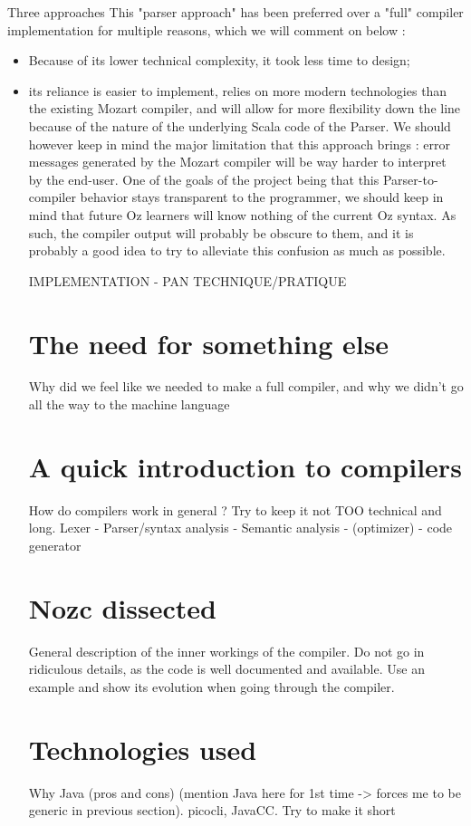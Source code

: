 Three approaches
This "parser approach" has been preferred over a "full" compiler implementation for multiple reasons, which we will comment on below :
\begin{itemize}
    \item Because of its lower technical complexity, it took less time to design;
    \item its reliance
is easier to implement, relies on more modern technologies than the existing Mozart compiler, and will allow for more flexibility down the line because of the nature of the underlying Scala code of the Parser.
We should however keep in mind the major limitation that this approach brings : error messages generated by the Mozart compiler will be way harder to interpret by the end-user.
One of the goals of the project being that this Parser-to-compiler behavior stays transparent to the programmer, we should keep in mind that future Oz learners will know nothing of the current Oz syntax.
As such, the compiler output will probably be obscure to them, and it is probably a good idea to try to alleviate this confusion as much as possible.\newline

IMPLEMENTATION - PAN TECHNIQUE/PRATIQUE

\section{The need for something else}\label{sec:ch3-1}
Why did we feel like we needed to make a full compiler, and why we didn't go all the way to the machine language

\section{A quick introduction to compilers}\label{sec:ch3-2}
How do compilers work in general ?
Try to keep it not TOO technical and long.
Lexer - Parser/syntax analysis - Semantic analysis - (optimizer) - code generator
\section{Nozc dissected}\label{sec:ch3-3}
General description of the inner workings of the compiler.
Do not go in ridiculous details, as the code is well documented and available.
Use an example and show its evolution when going through the compiler.

\section{Technologies used}\label{sec:ch3-4}
Why Java (pros and cons) (mention Java here for 1st time -> forces me to be generic in previous section). picocli, JavaCC.\newline
Try to make it short


\end{itemize}
